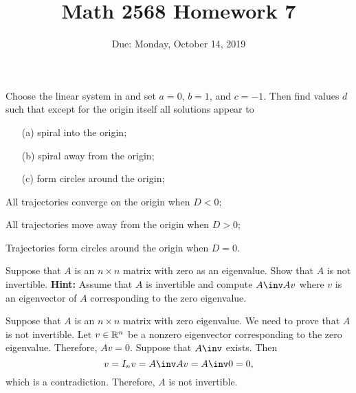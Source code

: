 \documentclass{article}
\title{Math 2568 Homework 7}
\author{\phantom{Dr. Golubitsky}}
\date{Due: Monday, October 14, 2019}
\begin{document}
\maketitle


\matlabproblemlabel



\begin{exercise} \label{c3.5.a01}
Choose the {\sf linear system} in {\pplane} and set $a=0$, $b=1$, and 
$c=-1$.  Then find values $d$ such that except for the origin itself all 
solutions appear to
\begin{itemize}
\item[(a)] spiral into the origin;
\item[(b)] spiral away from the origin;
\item[(c)] form circles around the origin;
\end{itemize}

\begin{solution}

\soln
\begin{enumeratea}
\item All trajectories converge on the origin when $D < 0$;

\item All trajectories move away from the origin when $D > 0$;

\item Trajectories form circles around the origin when $D = 0$.
\end{enumeratea}
\end{solution}
\end{exercise}





\problemlabel

\begin{exercise}  \label{c4.9.6A}
Suppose that $A$ is an $n\times n$ matrix with zero as an eigenvalue.
Show that $A$ is not invertible.  {\bf Hint:}  Assume that $A$ is invertible 
and compute $A\inv Av$ where $v$ is an eigenvector of $A$ corresponding to 
the zero eigenvalue.

\begin{solution}
\soln
Suppose that $A$ is an $n\times n$ matrix with zero eigenvalue.  We need to
prove that $A$ is not invertible.  Let $v\in\mathbb R^n$ be a nonzero 
eigenvector corresponding to the zero eigenvalue.  Therefore, $Av=0$. 
Suppose that $A\inv$ exists.  Then
\[
v = I_nv = A\inv Av = A\inv 0 = 0,
\]
which is a contradiction.  Therefore, $A$ is not invertible.

\end{solution}
\end{exercise}
\end{document}
